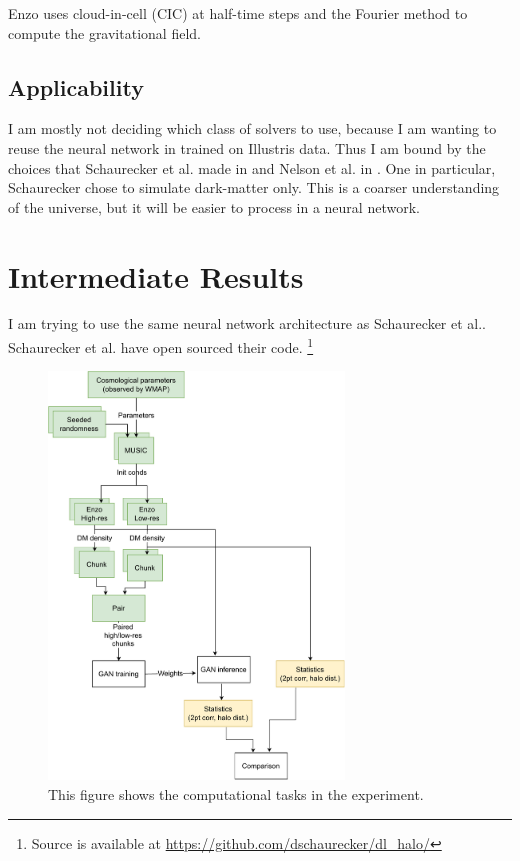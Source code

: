 Enzo uses cloud-in-cell (CIC) at half-time steps and the Fourier method to compute the gravitational field.

\subsection*{Applicability}

I am mostly not deciding which class of solvers to use, because I am wanting to reuse the neural network in \cite{schaurecker_super-resolving_2021} trained on Illustris data. Thus I am bound by the choices that Schaurecker et al. made in \cite{schaurecker_super-resolving_2021} and Nelson et al. in \cite{nelson_illustris_2015,vogelsberger_introducing_2014}. One in particular, Schaurecker chose to simulate dark-matter only. This is a coarser understanding of the universe, but it will be easier to process in a neural network.

\section*{Intermediate Results}

I am trying to use the same neural network architecture as Schaurecker et al.\cite{schaurecker_super-resolving_2021}. Schaurecker et al. have open sourced their code. \footnote{Source is available at \url{https://github.com/dschaurecker/dl_halo/}}

\begin{figure}[h!]
  \begin{centering}
    \includegraphics[width=0.7\textwidth]{./astrophysics-experiment-status.pdf}
  \end{centering}
  \caption{This figure shows the computational tasks in the experiment.}
  \label{workflow}
\end{figure}

